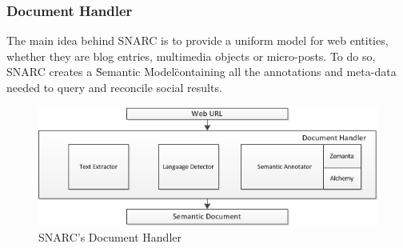 \documentclass[onecolumn, crcready]{iosart2c}
\begin{document}
\subsubsection{Document Handler}
The main idea behind SNARC is to provide a uniform model for web entities, whether they are blog entries, multimedia objects or micro-posts. To do so, SNARC creates a \"Semantic Model\" containing all the annotations and meta-data needed to query and reconcile social results. 
\begin{figure}[ht!]
  \centering
    \includegraphics[scale=0.8]{architecture-part1.png} 
  \caption{SNARC's Document Handler}
\end{figure}
\end{document}
